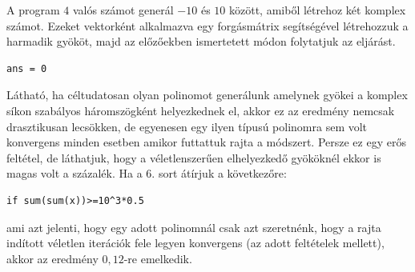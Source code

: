 \documentclass[a4paper,12pt]{report}
\begin{document}
A program $4$ valós számot generál $-10$ és $10$ között, amiből létrehoz két komplex számot. Ezeket vektorként alkalmazva egy forgásmátrix segítségével létrehozzuk a harmadik gyököt, majd az előzőekben ismertetett módon folytatjuk az eljárást.
				\begin{singlespace}
                \begin{lstlisting}[caption=Eredm\'eny]
ans = 0
                \end{lstlisting}
                \end{singlespace}
Látható, ha céltudatosan olyan polinomot generálunk amelynek gyökei a komplex síkon szabályos háromszögként helyezkednek el, akkor ez az eredmény nemcsak drasztikusan lecsökken, de egyenesen egy ilyen típusú polinomra sem volt konvergens minden esetben amikor futtattuk rajta a módszert. Persze ez egy erős feltétel, de láthatjuk, hogy a véletlenszerűen elhelyezkedő gyököknél ekkor is magas volt a százalék. Ha a 6. sort átírjuk a következőre: 
\begin{singlespace}
\begin{lstlisting}[firstnumber=6]
if sum(sum(x))>=10^3*0.5
\end{lstlisting}
\end{singlespace}
ami azt jelenti, hogy egy adott polinomnál csak azt szeretnénk, hogy a rajta indított véletlen iterációk fele legyen konvergens (az adott feltételek mellett), akkor az eredmény $0,\!12$-re emelkedik.
\end{document}
